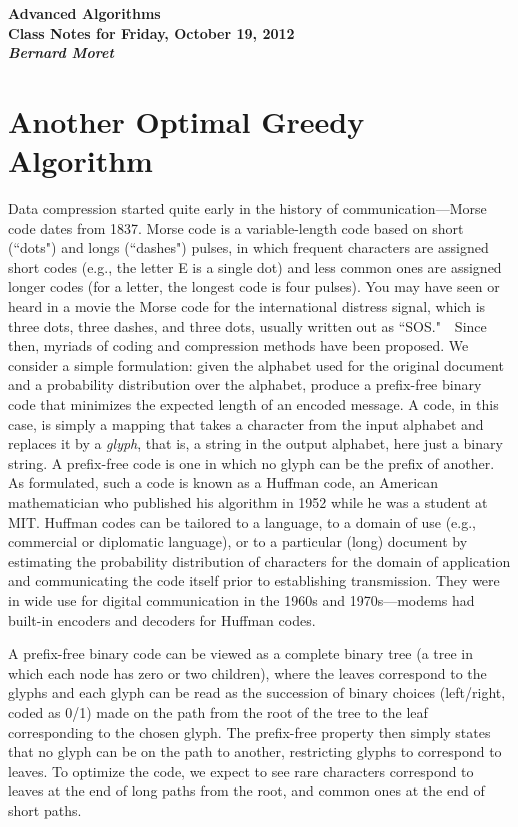 \documentclass[11pt]{article}
\begin{document}
\begin{center}
  \LARGE\bf Advanced Algorithms\\

  \Large\sf
  Class Notes for Friday, October 19, 2012\\

  \it
  Bernard Moret
\end{center}

\bigskip

\section{Another Optimal Greedy Algorithm}
Data compression started quite early in the history of communication---Morse
code dates from 1837.  Morse code
is a variable-length code based on short (``dots") and longs (``dashes") pulses,
in which frequent characters are assigned short codes (e.g., the letter E is
a single dot) and less common ones are assigned longer codes (for a letter,
the longest code is four pulses).  You may have seen or heard in a movie the
Morse code for the international distress signal, which is three dots,
three dashes, and three dots, usually written out as ``SOS."\ \ 
Since then, myriads of coding and compression methods have been
proposed.  We consider a simple formulation: given the alphabet used for the
original document and a probability distribution over the alphabet, produce
a prefix-free binary code that minimizes the expected length of an encoded
message.  A code, in this case, is simply a mapping that takes a character
from the input alphabet and replaces it by a \emph{glyph}, that is, a
string in the output alphabet, here just a binary string.
A prefix-free code is one in which no glyph can be the prefix of another.
As formulated, such a code is known as a Huffman code, an American
mathematician who published his algorithm in 1952 while he was a student
at MIT.  Huffman codes can be tailored to a language, to a domain of use
(e.g., commercial or diplomatic language), or to a particular (long)
document by estimating the probability distribution of characters
for the domain of application and communicating the code itself prior
to establishing transmission.   They were in wide use for digital communication
in the 1960s and 1970s---modems had built-in encoders and decoders for
Huffman codes.

A prefix-free binary code can be viewed as a complete binary tree (a tree
in which each node has zero or two children), where the leaves correspond
to the glyphs and each glyph can be read as the succession of binary
choices (left/right, coded as 0/1) made on the path from the root of
the tree to the leaf corresponding to the chosen glyph.  The prefix-free
property then simply states that no glyph can be on the path to another,
restricting glyphs to correspond to leaves.  To optimize the code, we expect
to see rare characters correspond to leaves at the end of long paths from
the root, and common ones at the end of short paths.
\end{document}
